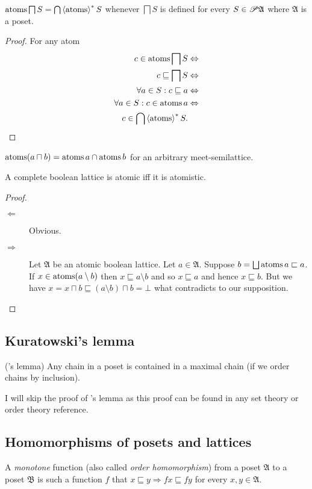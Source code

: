 \begin{thm}
$\operatorname{atoms}\bigsqcap S=\bigcap\left\langle \operatorname{atoms}\right\rangle ^{\ast}S$ whenever $\bigsqcap S$
is defined for every $S\in\mathscr{P}\mathfrak{A}$ where $\mathfrak{A}$
is a poset.\end{thm}
\begin{proof}
For any atom
\begin{align*}
c\in\operatorname{atoms}\bigsqcap S & \Leftrightarrow\\
c\sqsubseteq\bigsqcap S & \Leftrightarrow\\
\forall a\in S:c\sqsubseteq a & \Leftrightarrow\\
\forall a\in S:c\in\operatorname{atoms} a & \Leftrightarrow\\
c\in\bigcap\left\langle \operatorname{atoms}\right\rangle ^{\ast}S.
\end{align*}
\end{proof}
\begin{cor}
\label{atoms-meet}$\operatorname{atoms}(a\sqcap b)=\operatorname{atoms} a\cap\operatorname{atoms} b$ for an
arbitrary meet-semilattice.\end{cor}
\begin{thm}
A complete boolean lattice is atomic iff it is atomistic.\end{thm}
\begin{proof}
~
\begin{description}
\item [{$\Leftarrow$}] Obvious.
\item [{$\Rightarrow$}] Let $\mathfrak{A}$ be an atomic boolean lattice.
Let $a\in\mathfrak{A}$. Suppose $b=\bigsqcup\operatorname{atoms} a\sqsubset a$.
If $x\in\operatorname{atoms}(a\setminus b)$ then $x\sqsubseteq a\setminus b$ and
so $x\sqsubseteq a$ and hence $x\sqsubseteq b$. But we have $x=x\sqcap b\sqsubseteq(a\setminus b)\sqcap b=\bot$
what contradicts to our supposition.
\end{description}
\end{proof}

\subsection{Kuratowski's lemma}
\begin{thm}
('s lemma) Any chain in a poset is contained in a maximal
chain (if we order chains by inclusion).
\end{thm}
I will skip the proof of 's lemma as this proof can be found
in any set theory or order theory reference.


\subsection{Homomorphisms of posets and lattices}
\begin{defn}
A \emph{monotone} function
(also called \emph{order homomorphism}) from a poset $\mathfrak{A}$
to a poset $\mathfrak{B}$ is such a function $f$ that $x\sqsubseteq y\Rightarrow fx\sqsubseteq fy$
for every $x,y\in\mathfrak{A}$.
\end{defn}


